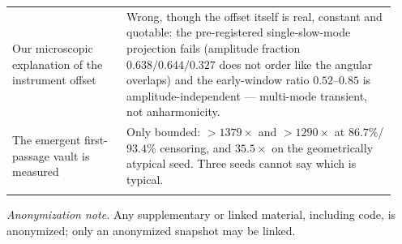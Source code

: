 {\begin{center}
\begin{tabular}{p{0.28\linewidth}p{0.66\linewidth}}
Our microscopic explanation of the instrument offset & Wrong, though the offset itself is real, constant and quotable: the pre-registered single-slow-mode projection fails (amplitude fraction $0.638/0.644/0.327$ does not order like the angular overlaps) and the early-window ratio $0.52$--$0.85$ is amplitude-independent --- multi-mode transient, not anharmonicity.\\
The emergent first-passage vault is measured & Only bounded: $>1379\times$ and $>1290\times$ at $86.7\%$/$93.4\%$ censoring, and $35.5\times$ on the geometrically atypical seed. Three seeds cannot say which is typical.\\\\
\bottomrule
\end{tabular}
\end{center}\par}

\emph{Anonymization note.} Any supplementary or linked material, including code, is anonymized; only an anonymized snapshot may be linked.
